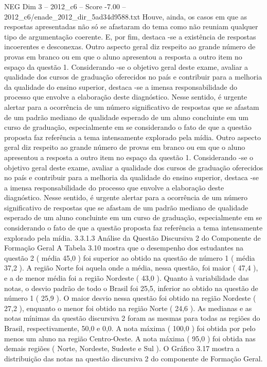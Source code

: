 \begin{textsample}{NEG Dim 3 – 2012\_c6 – Score -7.00 – 2012\_c6/enade\_2012\_dir\_5ad34d9588.txt}
Houve, ainda, os casos em que as respostas apresentadas não só se afastaram do tema como não reuniam qualquer tipo de argumentação coerente.
E, por fim, destaca -se a existência de respostas incoerentes e desconexas.
Outro aspecto geral diz respeito ao grande número de provas em branco ou em que o aluno apresentou a resposta a outro item no espaço da questão 1.
Considerando -se o objetivo geral deste exame, avaliar a qualidade dos cursos de graduação oferecidos no país e contribuir para a melhoria da qualidade do ensino superior, destaca -se a imensa responsabilidade do processo que envolve a elaboração deste diagnóstico.
Nesse sentido, é urgente alertar para a ocorrência de um número significativo de respostas que se afastam de um padrão mediano de qualidade esperado de um aluno concluinte em um curso de graduação, especialmente em se considerando o fato de que a questão proposta faz referência a tema intensamente explorado pela mídia.
Outro aspecto geral diz respeito ao grande número de provas em branco ou em que o aluno apresentou a resposta a outro item no espaço da questão 1.
Considerando -se o objetivo geral deste exame, avaliar a qualidade dos cursos de graduação oferecidos no país e contribuir para a melhoria da qualidade do ensino superior, destaca -se a imensa responsabilidade do processo que envolve a elaboração deste diagnóstico.
Nesse sentido, é urgente alertar para a ocorrência de um número significativo de respostas que se afastam de um padrão mediano de qualidade esperado de um aluno concluinte em um curso de graduação, especialmente em se considerando o fato de que a questão proposta faz referência a tema intensamente explorado pela mídia. 3.3.1.3 Análise da Questão Discursiva 2 do Componente de Formação Geral A Tabela 3.10 mostra que o desempenho dos estudantes na questão 2 ( média 45,0 ) foi superior ao obtido na questão de número 1 ( média 37,2 ).
A região Norte foi aquela onde a média, nessa questão, foi maior ( 47,4 ), e a de menor média foi a região Nordeste ( 43,0 ).
Quanto à variabilidade das notas, o desvio padrão de todo o Brasil foi 25,5, inferior ao obtido na questão de número 1 ( 25,9 ).
O maior desvio nessa questão foi obtido na região Nordeste ( 27,2 ), enquanto o menor foi obtido na região Norte ( 24,6 ).
As medianas e as notas mínimas da questão discursiva 2 foram as mesmas para todas as regiões do Brasil, respectivamente, 50,0 e 0,0.
A nota máxima ( 100,0 ) foi obtida por pelo menos um aluno na região Centro-Oeste.
A nota máxima ( 95,0 ) foi obtida nas demais regiões ( Norte, Nordeste, Sudeste e Sul ).
O Gráfico 3.17 mostra a distribuição das notas na questão discursiva 2 do componente de Formação Geral.

\end{textsample}

